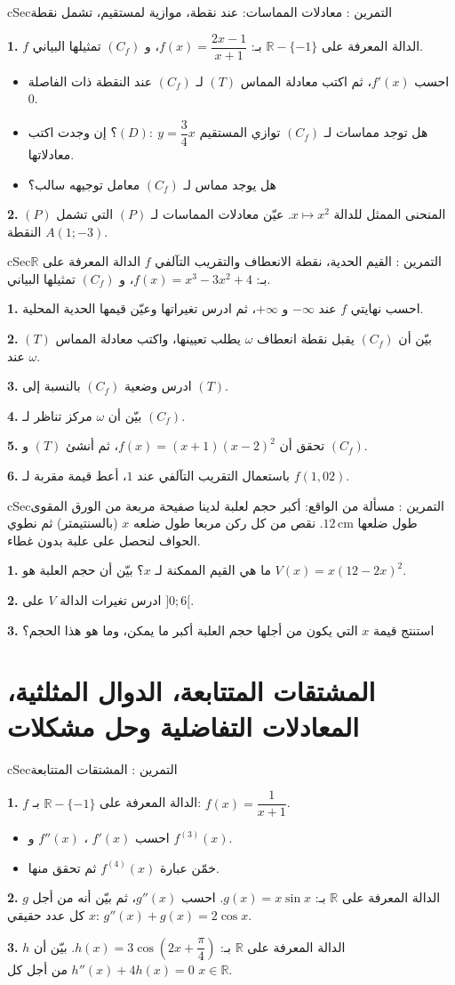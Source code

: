\documentclass[12pt,a4paper]{article}
\newenvironment{BOX}[2]{\begin{otherlanguage}{english}\begin{arbox}{#1}{#2}}{\end{arbox}\end{otherlanguage}}
\newcounter{exo}
\newenvironment{tamrin}[1]{\stepcounter{exo}\begin{BOX}{cSec}{التمرين \theexo: #1}}{\end{BOX}}
\newcommand{\R}{\mathbb{R}}
\newenvironment{sq}{\begin{itemize}[leftmargin=2.4em,itemsep=3pt]}{\end{itemize}}
\newcommand{\qa}{\item[(أ)]}\newcommand{\qb}{\item[(ب)]}\newcommand{\qc}{\item[(جـ)]}\newcommand{\qd}{\item[(د)]}\newcommand{\qe}{\item[(هـ)]}
\newcommand{\QQ}[1]{\par\smallskip\textbf{#1.} }
\begin{document}
\begin{tamrin}{معادلات المماسات: عند نقطة، موازية لمستقيم، تشمل نقطة}
\QQ{1} $f$ الدالة المعرفة على $\R-\{-1\}$ بـ: $f(x)=\dfrac{2x-1}{x+1}$، و $(C_f)$ تمثيلها البياني.
\begin{sq}
\qa احسب $f'(x)$، ثم اكتب معادلة المماس $(T)$ لـ $(C_f)$ عند النقطة ذات الفاصلة $0$.
\qb هل توجد مماسات لـ $(C_f)$ توازي المستقيم $(D):\ y=\dfrac34x$؟ إن وجدت اكتب معادلاتها.
\qc هل يوجد مماس لـ $(C_f)$ معامل توجيهه سالب؟
\end{sq}
\QQ{2} $(P)$ المنحنى الممثل للدالة $x\mapsto x^{2}$. عيّن معادلات المماسات لـ $(P)$ التي تشمل النقطة $A(1;-3)$.
\end{tamrin}

\begin{tamrin}{القيم الحدية، نقطة الانعطاف والتقريب التآلفي}
$f$ الدالة المعرفة على $\R$ بـ: $f(x)=x^{3}-3x^{2}+4$، و $(C_f)$ تمثيلها البياني.
\QQ{1} احسب نهايتي $f$ عند $-\infty$ و $+\infty$، ثم ادرس تغيراتها وعيّن قيمها الحدية المحلية.
\QQ{2} بيّن أن $(C_f)$ يقبل نقطة انعطاف $\omega$ يطلب تعيينها، واكتب معادلة المماس $(T)$ عند $\omega$.
\QQ{3} ادرس وضعية $(C_f)$ بالنسبة إلى $(T)$.
\QQ{4} بيّن أن $\omega$ مركز تناظر لـ $(C_f)$.
\QQ{5} تحقق أن $f(x)=(x+1)(x-2)^{2}$، ثم أنشئ $(T)$ و $(C_f)$.
\QQ{6} باستعمال التقريب التآلفي عند $1$، أعط قيمة مقربة لـ $f(1{,}02)$.
\end{tamrin}

\begin{tamrin}{مسألة من الواقع: أكبر حجم لعلبة}
لدينا صفيحة مربعة من الورق المقوى طول ضلعها $12\,\text{cm}$. نقص من كل ركن مربعا طول ضلعه $x$ (بالسنتيمتر) ثم نطوي الحواف لنحصل على علبة بدون غطاء.
\QQ{1} ما هي القيم الممكنة لـ $x$؟ بيّن أن حجم العلبة هو $V(x)=x(12-2x)^{2}$.
\QQ{2} ادرس تغيرات الدالة $V$ على $]0;6[$.
\QQ{3} استنتج قيمة $x$ التي يكون من أجلها حجم العلبة أكبر ما يمكن، وما هو هذا الحجم؟
\end{tamrin}
\section{المشتقات المتتابعة، الدوال المثلثية، المعادلات التفاضلية وحل مشكلات}
\begin{tamrin}{المشتقات المتتابعة}
\QQ{1} $f$ الدالة المعرفة على $\R-\{-1\}$ بـ: $f(x)=\dfrac{1}{x+1}$.
\begin{sq}
\qa احسب $f'(x)$ ، $f''(x)$ و $f^{(3)}(x)$.
\qb خمّن عبارة $f^{(4)}(x)$ ثم تحقق منها.
\end{sq}
\QQ{2} $g$ الدالة المعرفة على $\R$ بـ: $g(x)=x\sin x$. احسب $g''(x)$، ثم بيّن أنه من أجل كل عدد حقيقي $x$: $g''(x)+g(x)=2\cos x$.
\QQ{3} $h$ الدالة المعرفة على $\R$ بـ: $h(x)=3\cos\left(2x+\dfrac{\pi}{4}\right)$. بيّن أن $h''(x)+4h(x)=0$ من أجل كل $x\in\R$.
\end{tamrin}
\end{document}
